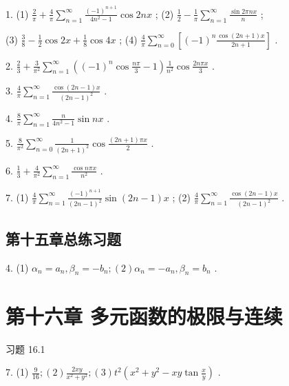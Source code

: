 1. (1) \(\frac{2}{\pi } + \frac{4}{\pi }\mathop{\sum }\limits_{{n = 1}}^{\infty }\frac{{\left( -1\right) }^{n + 1}}{4{n}^{2} - 1}\cos {2nx}\) ; (2) \(\frac{1}{2} - \frac{1}{\pi }\mathop{\sum }\limits_{{n = 1}}^{\infty }\frac{\sin {2\pi nx}}{n}\) ;

(3) \(\frac{3}{8} - \frac{1}{2}\cos {2x} + \frac{1}{8}\cos {4x}\) ; (4) \(\frac{4}{\pi }\mathop{\sum }\limits_{{n = 0}}^{\infty }\left\lbrack  {{\left( -1\right) }^{n}\frac{\cos \left( {{2n} + 1}\right) x}{{2n} + 1}}\right\rbrack\) .

2. \(\frac{2}{3} + \frac{3}{{\pi }^{2}}\mathop{\sum }\limits_{{n = 1}}^{\infty }\left( {{\left( -1\right) }^{n}\cos \frac{n\pi }{3} - 1}\right) \frac{1}{{n}^{2}}\cos \frac{2n\pi x}{3}\) .

3. \(\frac{4}{\pi }\mathop{\sum }\limits_{{n = 1}}^{\infty }\frac{\cos \left( {{2n} - 1}\right) x}{{\left( 2n - 1\right) }^{2}}\) .

4. \(\frac{8}{\pi }\mathop{\sum }\limits_{{n = 1}}^{\infty }\frac{n}{4{n}^{2} - 1}\sin {nx}\) .

5. \(\frac{8}{{\pi }^{2}}\mathop{\sum }\limits_{{n = 0}}^{\infty }\frac{1}{{\left( 2n + 1\right) }^{2}}\cos \frac{\left( {{2n} + 1}\right) {\pi x}}{2}\) .

6. \(\frac{1}{3} + \frac{4}{{\pi }^{2}}\mathop{\sum }\limits_{{n = 1}}^{\infty }\frac{\cos {n\pi x}}{{n}^{2}}\) .

7. (1) \(\frac{4}{\pi }\mathop{\sum }\limits_{{n = 1}}^{\infty }\frac{{\left( -1\right) }^{n + 1}}{{\left( 2n - 1\right) }^{2}}\sin \left( {{2n} - 1}\right) x\) ; (2) \(\frac{4}{\pi }\mathop{\sum }\limits_{{n = 1}}^{\infty }\frac{\cos \left( {{2n} - 1}\right) x}{{\left( 2n - 1\right) }^{2}}\) .

\subsection{第十五章总练习题}

4. (1) \({\alpha }_{n} = {a}_{n},{\beta }_{n} =  - {b}_{n};\left( 2\right) {\alpha }_{n} =  - {a}_{n},{\beta }_{n} = {b}_{n}\) .

\section{第十六章 多元函数的极限与连续}

习题 16.1

7. (1) \(\frac{9}{16};\left( 2\right) \frac{2xy}{{x}^{2} + {y}^{2}};\left( 3\right) {t}^{2}\left( {{x}^{2} + {y}^{2} - {xy}\tan \frac{x}{y}}\right)\) .

